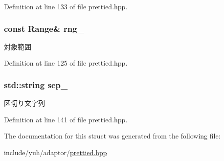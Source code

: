 \-Definition at line 133 of file prettied.\-hpp.

\hypertarget{structyuh_1_1range__detail_1_1range__io_a1dc23cf32ae84636d442489c9629b987}{
\subsubsection[{rng\-\_\-}]{\setlength{\rightskip}{0pt plus 5cm}const \-Range\& {\bf rng\-\_\-}}}\label{da/d75/structyuh_1_1range__detail_1_1range__io_a1dc23cf32ae84636d442489c9629b987}
対象範囲 

\-Definition at line 125 of file prettied.\-hpp.

\hypertarget{structyuh_1_1range__detail_1_1range__io_ae5b41e2a505b540f0b9a6e995030bcba}{
\subsubsection[{sep\-\_\-}]{\setlength{\rightskip}{0pt plus 5cm}std\-::string {\bf sep\-\_\-}}}\label{da/d75/structyuh_1_1range__detail_1_1range__io_ae5b41e2a505b540f0b9a6e995030bcba}
区切り文字列 

\-Definition at line 141 of file prettied.\-hpp.



\-The documentation for this struct was generated from the following file\-:\begin{DoxyCompactItemize}
\item 
include/yuh/adaptor/\hyperlink{prettied_8hpp}{prettied.\-hpp}\end{DoxyCompactItemize}

